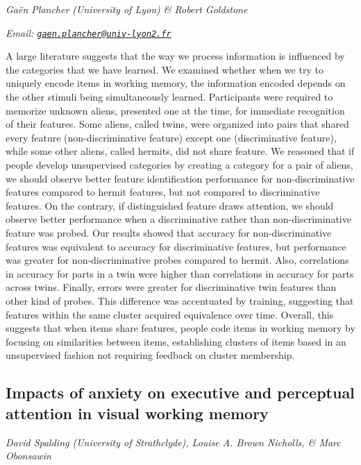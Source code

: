 \documentclass[12pt,]{book}
\begin{document}
\emph{Gaën Plancher (University of Lyon) \& Robert Goldstone}

\emph{Email: \href{mailto:gaen.plancher@univ-lyon2.fr}{\nolinkurl{gaen.plancher@univ-lyon2.fr}}}

A large literature suggests that the way we process information is influenced by the categories that we have learned. We examined whether when we try to uniquely encode items in working memory, the information encoded depends on the other stimuli being simultaneously learned. Participants were required to memorize unknown aliens, presented one at the time, for immediate recognition of their features. Some aliens, called twins, were organized into pairs that shared every feature (non-discriminative feature) except one (discriminative feature), while some other aliens, called hermits, did not share feature. We reasoned that if people develop unsupervised categories by creating a category for a pair of aliens, we should observe better feature identification performance for non-discriminative features compared to hermit features, but not compared to discriminative features. On the contrary, if distinguished feature draws attention, we should observe better performance when a discriminative rather than non-discriminative feature was probed. Our results showed that accuracy for non-discriminative features was equivalent to accuracy for discriminative features, but performance was greater for non-discriminative probes compared to hermit. Also, correlations in accuracy for parts in a twin were higher than correlations in accuracy for parts across twins. Finally, errors were greater for discriminative twin features than other kind of probes. This difference was accentuated by training, suggesting that features within the same cluster acquired equivalence over time. Overall, this suggests that when items share features, people code items in working memory by focusing on similarities between items, establishing clusters of items based in an unsupervised fashion not requiring feedback on cluster membership.

\hypertarget{impacts-of-anxiety-on-executive-and-perceptual-attention-in-visual-working-memory}{%
\subsection{Impacts of anxiety on executive and perceptual attention in visual working memory}\label{impacts-of-anxiety-on-executive-and-perceptual-attention-in-visual-working-memory}}

\emph{David Spalding (University of Strathclyde), Louise A. Brown Nicholls, \& Marc Obonsawin}
\end{document}
